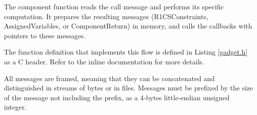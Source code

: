 	The component function reads the call message and performs its specific computation. It prepares the resulting messages (R1CSConstraints, AssignedVariables, or ComponentReturn) in memory, and calls the callbacks with pointers to these messages.

	The function definition that implements this flow is defined in Listing \ref{gadget.h} as a C header. Refer to the inline documentation for more details.

	All messages are framed, meaning that they can be concatenated and distinguished in streams of bytes or in files.
	Messages must be prefixed by the size of the message not including the prefix,
	as a 4-bytes little-endian unsigned integer.
